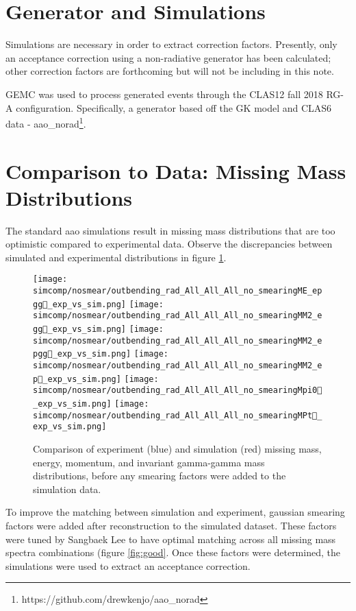 \section{Generator and Simulations}
    Simulations are necessary in order to extract correction factors. Presently, only an acceptance correction using a non-radiative generator has been calculated; other correction factors are forthcoming but will not be including in this note. 

    GEMC was used to process generated events through the CLAS12 fall 2018 RG-A configuration. Specifically, a generator based off the GK model and CLAS6 data - aao\_norad\footnote{https://github.com/drewkenjo/aao\_norad}. 
    

\section{Comparison to Data: Missing Mass Distributions}

The standard aao simulations result in missing mass distributions that are too optimistic compared to experimental data. Observe the discrepancies between simulated and experimental distributions in figure \ref{fig:bad}. 


\begin{figure}[hbt]
	\centering
	\texttt{[image: simcomp/nosmear/outbending\_rad\_All\_All\_All\_no\_smearingME\_epgg\_exp\_vs\_sim.png]}
	\texttt{[image: simcomp/nosmear/outbending\_rad\_All\_All\_All\_no\_smearingMM2\_egg\_exp\_vs\_sim.png]}
	\texttt{[image: simcomp/nosmear/outbending\_rad\_All\_All\_All\_no\_smearingMM2\_epgg\_exp\_vs\_sim.png]}
	\texttt{[image: simcomp/nosmear/outbending\_rad\_All\_All\_All\_no\_smearingMM2\_ep\_exp\_vs\_sim.png]}
	\texttt{[image: simcomp/nosmear/outbending\_rad\_All\_All\_All\_no\_smearingMpi0\_exp\_vs\_sim.png]}
	\texttt{[image: simcomp/nosmear/outbending\_rad\_All\_All\_All\_no\_smearingMPt\_exp\_vs\_sim.png]}
	
	\caption{Comparison of experiment (blue) and simulation (red) missing mass, energy, momentum, and invariant gamma-gamma mass distributions, before any smearing factors were added to the simulation data.}
	\label{fig:bad}
\end{figure}



To improve the matching between simulation and experiment, gaussian smearing factors were added after reconstruction to the simulated dataset. These factors were tuned by Sangbaek Lee to have optimal matching across all missing mass spectra combinations (figure \ref{fig:good}. Once these factors were determined, the simulations were used to extract an acceptance correction.


